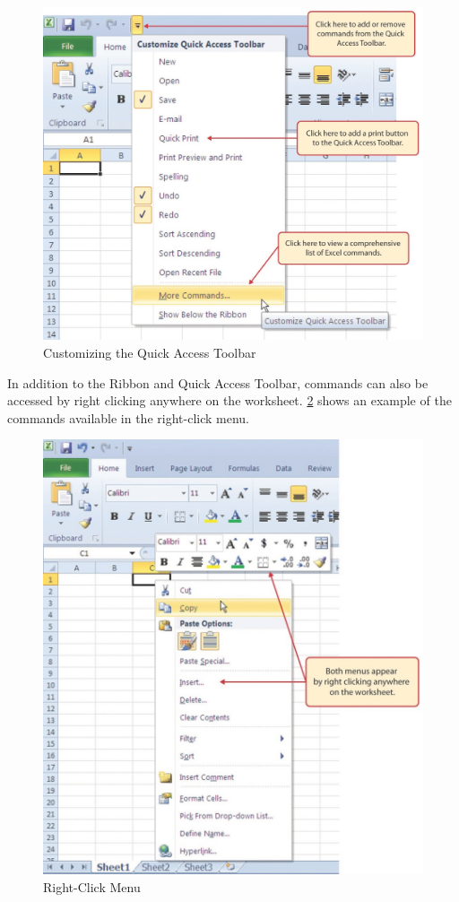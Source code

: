 \begin{figure}[H]
	\centering
	\includegraphics[width=\maxwidth{.95\linewidth}]{gfx/ch01_fig07}
	\caption{Customizing the Quick Access Toolbar}
	\label{01:fig07}
\end{figure}

In addition to the Ribbon and Quick Access Toolbar, commands can also be accessed by right clicking anywhere on the worksheet. \ref{01:fig08} shows an example of the commands available in the right-click menu.

\begin{figure}[H]
	\centering
	\includegraphics[width=\maxwidth{.95\linewidth}]{gfx/ch01_fig08}
	\caption{Right-Click Menu}
	\label{01:fig08}
\end{figure}

